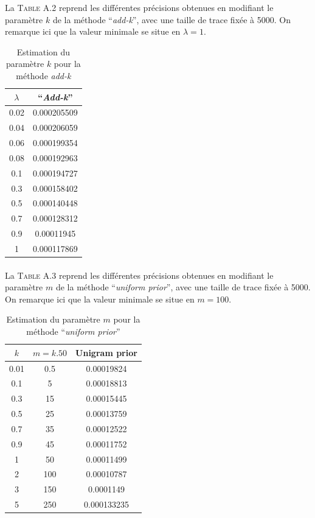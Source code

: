 \documentclass[a4paper,titlepage]{report}
\begin{document}
La \textsc{Table A.2} reprend les différentes précisions obtenues en modifiant le paramètre $k$ de la méthode ``\textit{add-k}'', avec une taille de trace fixée à 5000. On remarque ici que la valeur minimale se situe en $\lambda = 1$.
\begin{table}[h]
	\center
	\begin{tabular}{c|c}
		$\lambda$ & ``\textit{Add-k}''\\
		\hline
		0.02 & \num{0.000205509}\\
		0.04 & \num{0.000206059}\\
		0.06 & \num{0.000199354}\\
		0.08 & \num{0.000192963}\\
		0.1 & \num{0.000194727}\\
		0.3 & \num{0.000158402}\\
		0.5 & \num{0.000140448}\\
		0.7 & \num{0.000128312}\\
		0.9 & \num{0.00011945}\\
		1 & \num{0.000117869}
	\end{tabular}
	\caption{Estimation du paramètre $k$ pour la méthode \textit{add-k}}
\end{table}

\paragraph{}
La \textsc{Table A.3} reprend les différentes précisions obtenues en modifiant le paramètre $m$ de la méthode ``\textit{uniform prior}'', avec une taille de trace fixée à 5000. On remarque ici que la valeur minimale se situe en $m = 100$.

\begin{table}[h]
	\center
	\begin{tabular}{c|c|c}
		$k$ & $m = k . 50$ & Unigram prior\\
		\hline
		0.01 & 0.5 & \num{0.00019824}\\
		0.1 & 5 & \num{0.00018813}\\
		0.3 & 15 & \num{0.00015445}\\
		0.5 & 25 & \num{0.00013759}\\
		0.7 & 35 & \num{0.00012522}\\
		0.9 & 45 & \num{0.00011752}\\
		1 & 50 & \num{0.00011499}\\
		2 & 100 & \num{0.00010787}\\
		3 & 150 & \num{0.0001149}\\
		5 & 250 & \num{0.000133235}
	\end{tabular}
	\caption{Estimation du paramètre $m$ pour la méthode ``\textit{uniform prior}''}
\end{table}
\end{document}

